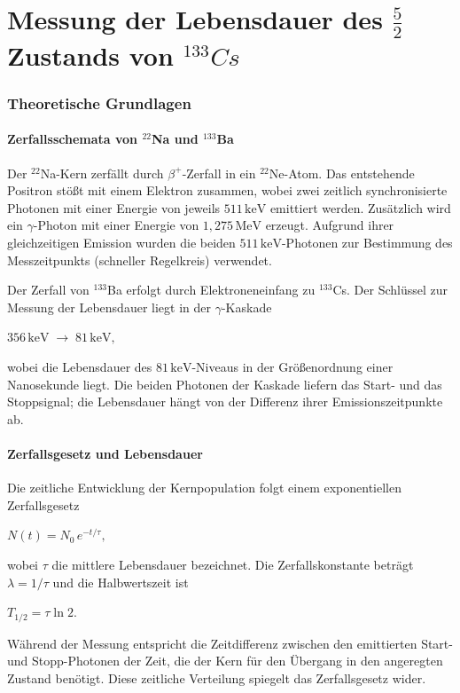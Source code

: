 \chapter{Messung der Lebensdauer des $\frac{5}{2}$ Zustands von $^{133}Cs$}

\subsection{Theoretische Grundlagen}

\subsubsection{Zerfallsschemata von \texorpdfstring{$^{22}$Na}{22Na} und \texorpdfstring{$^{133}$Ba}{133Ba}}
Der $^{22}$Na-Kern zerfällt durch $\beta^+$-Zerfall in ein $^{22}$Ne-Atom. Das entstehende Positron stößt mit einem Elektron zusammen, wobei zwei zeitlich synchronisierte Photonen mit einer Energie von jeweils $511\,\mathrm{keV}$ emittiert werden. Zusätzlich wird ein $\gamma$-Photon mit einer Energie von $1{,}275\,\mathrm{MeV}$ erzeugt. Aufgrund ihrer gleichzeitigen Emission wurden die beiden $511\,\mathrm{keV}$-Photonen zur Bestimmung des Messzeitpunkts (schneller Regelkreis) verwendet.

Der Zerfall von $^{133}$Ba erfolgt durch Elektroneneinfang zu $^{133}$Cs. Der Schlüssel zur Messung der Lebensdauer liegt in der $\gamma$-Kaskade

$
356\,\mathrm{keV} \;\rightarrow\; 81\,\mathrm{keV},
$\cite{praktikum}

wobei die Lebensdauer des $81\,\mathrm{keV}$-Niveaus in der Größenordnung einer Nanosekunde liegt. Die beiden Photonen der Kaskade liefern das Start- und das Stoppsignal; die Lebensdauer hängt von der Differenz ihrer Emissionszeitpunkte ab.

\subsubsection{Zerfallsgesetz und Lebensdauer}

Die zeitliche Entwicklung der Kernpopulation folgt einem exponentiellen Zerfallsgesetz \cite{praktikum}

$
N(t) = N_0\, e^{-t/\tau},
$

wobei $\tau$ die mittlere Lebensdauer bezeichnet. Die Zerfallskonstante beträgt $\lambda = 1/\tau$ und die Halbwertszeit ist

$
T_{1/2} = \tau \ln 2.
$

Während der Messung entspricht die Zeitdifferenz zwischen den emittierten Start- und Stopp-Photonen der Zeit, die der Kern für den Übergang in den angeregten Zustand benötigt. Diese zeitliche Verteilung spiegelt das Zerfallsgesetz wider.
